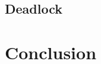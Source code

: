 \documentclass{acm_proc_article-sp}
\begin{document}
\subsection{Deadlock}



\section{Conclusion}
\label{sec:conclusion}
%

%



\appendix



\nocite{*}
%
%


\end{document}
